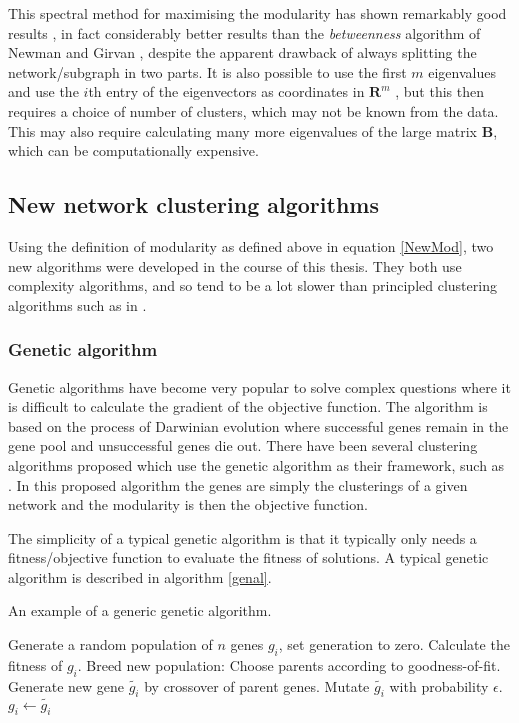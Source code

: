This spectral method for maximising the modularity has shown
remarkably good results \cite{Newman2006a}, in fact considerably better results
than the {\sl betweenness} algorithm of Newman and Girvan 
\cite{NewmanGirvan2004a}, despite the apparent drawback of always splitting the 
network/subgraph in two parts. It is also possible to use the first $m$ 
eigenvalues and use the $i$th entry of the eigenvectors as coordinates in 
$\mathbf{R}^{m}$ \cite{Humphries2011a}, but this then requires a choice of 
number of clusters, which may not be known from the data.  This may also 
require calculating many more eigenvalues of the large matrix $\mathbf{B}$, 
which can be computationally expensive.

\subsection{New network clustering algorithms}
Using the definition of modularity as defined above in equation \ref{NewMod}, two new algorithms were developed in the course of this thesis.  They both use complexity algorithms, and so tend to be a lot slower than principled clustering algorithms such as in \cite{Newman2006a} \cite{NewmanGirvan2004a}.

\subsubsection{Genetic algorithm}
Genetic algorithms have become very popular to solve complex questions where it is difficult to calculate the gradient of the objective function.  The algorithm is based on the process of Darwinian evolution where successful genes remain in the gene pool and unsuccessful genes die out.  There have been several clustering algorithms proposed which use the genetic algorithm as their framework, such as \cite{Pizzuti2008a}. In this proposed algorithm the genes are simply the clusterings of a given network and the modularity is then the objective function.

The simplicity of a typical genetic algorithm is that it typically only needs a fitness/objective function to evaluate the fitness of solutions.  A typical genetic algorithm is described in algorithm \ref{genal}.

\begin{algorithm}
\caption{An example of a generic genetic algorithm.}
\label{genal}
\begin{algorithmic}
\STATE Generate a random population of $n$ genes $g_i$, set generation to zero.
\STATE Calculate the fitness of $g_i$.
\ENDFOR
\STATE Breed new population:
\STATE Choose parents according to goodness-of-fit.
\STATE Generate new gene $\tilde{g_i}$ by crossover of parent genes.
\STATE Mutate $\tilde{g_i}$ with probability $\epsilon$.
\ENDFOR
{} \STATE $g_i \leftarrow \tilde{g_i}$ \ENDFOR
\ENDWHILE
\end{algorithmic}
\end{algorithm}


